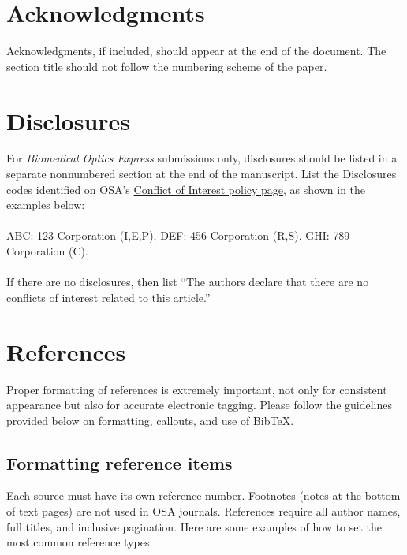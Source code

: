 \documentclass[10pt]{article}
\begin{document}
\section*{Acknowledgments}
Acknowledgments, if included, should appear at the end of the document. The section title should not follow the numbering scheme of the paper.

\section*{Disclosures}
For \textit{Biomedical Optics Express} submissions only, disclosures should be listed in a separate nonnumbered section at the end of the manuscript. List the Disclosures codes identified on OSA's \href{http://www.osapublishing.org/submit/review/conflicts-interest-policy.cfm}{Conflict of Interest policy page}, as shown in the examples below:\\
\\
ABC: 123 Corporation (I,E,P), DEF: 456 Corporation (R,S). GHI: 789 Corporation (C).\\
\\
If there are no disclosures, then list ``The authors declare that there are no conflicts of interest related to this article.''


\section{References}
\label{sec:refs}
Proper formatting of references is extremely important, not only for consistent appearance but also for accurate electronic tagging. Please follow the guidelines provided below on formatting, callouts, and use of Bib\TeX.

\subsection{Formatting reference items}
Each source must have its own reference number. Footnotes (notes at the bottom of text pages) are not used in OSA journals. References require all author names, full titles, and inclusive pagination. Here are some examples of how to set the most common reference types:
\end{document}
